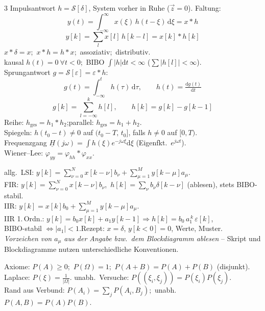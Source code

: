 \begin{multicols}{3}
Impulsantwort $h=\mathcal S[\delta]$, System vorher in Ruhe ($\vec z=0$). Faltung:
\[ y(t)=\!\int_{-\infty}^{\infty}\! x(\xi)\,h(t-\xi)\,\mathrm d\xi=x*h \]
\[ y[k]=\sum_{l} x[l]\,h[k-l]=x[k]*h[k] \]
$x*\delta=x$;\ $x*h=h*x$;\ assoziativ;\ distributiv.\\
kausal $h(t)=0\ \forall t<0$;\ BIBO $\int|h|\mathrm dt<\infty$ ($\sum|h[l]|<\infty$).\\
Sprungantwort $g=\mathcal S[\varepsilon]=\varepsilon*h$:
\[ g(t)=\!\int_{-\infty}^{t}\! h(\tau)\,\mathrm d\tau,\qquad h(t)=\tfrac{\mathrm dg(t)}{\mathrm dt} \]
\[ g[k]=\sum_{l=-\infty}^{k} h[l],\qquad h[k]=g[k]-g[k-1] \]
Reihe: $h_{\text{ges}}=h_1*h_2$;\quad parallel: $h_{\text{ges}}=h_1+h_2$.\\
Spiegeln: $h(t_0-t)\ne0$ auf $(t_0-T,\,t_0]$, falls $h\ne0$ auf $[0,T)$.\\
Frequenzgang $\underline H(j\omega)=\int h(\xi)e^{-j\omega\xi}\mathrm d\xi$ (Eigenfkt.\ $e^{j\omega t}$).\\
Wiener--Lee: $\varphi_{yy}=\varphi_{hh}*\varphi_{xx}$.

allg.\ LSI: $y[k]=\sum_{\nu=0}^{N} x[k{-}\nu]b_\nu+\sum_{\mu=1}^{M} y[k{-}\mu]a_\mu$.\\
FIR: $y[k]=\sum_{\nu=0}^{N} x[k{-}\nu]b_\nu$,\ $h[k]=\sum_{\nu} b_\nu\delta[k{-}\nu]$ (ablesen),
stets BIBO-stabil.\\
IIR: $y[k]=x[k]b_0+\sum_{\mu=1}^{M} y[k{-}\mu]a_\mu$.\\
IIR 1.\,Ordn.: $y[k]=b_0x[k]+a_1y[k{-}1]\Rightarrow h[k]=b_0\,a_1^{\,k}\,\varepsilon[k]$,\\
BIBO-stabil $\Leftrightarrow|a_1|<1$.\quad Rezept: $x=\delta$, $y[k{<}0]=0$, Werte, Muster.\\
\emph{Vorzeichen von $a_\mu$ aus der Angabe bzw.\ dem Blockdiagramm ablesen} --
Skript und Blockdiagramme nutzen unterschiedliche Konventionen.

Axiome: $P(A)\ge0$;\ $P(\Omega)=1$;\ $P(A{+}B)=P(A)+P(B)$ (disjunkt).\\
Laplace: $P(\xi)=\tfrac{1}{|\Omega|}$.\quad
unabh.\ Versuche: $P((\xi_i,\xi_j))=P(\xi_i)P(\xi_j)$.\\
Rand aus Verbund: $P(A_i)=\sum_j P(A_i,B_j)$;\ unabh.\ $P(A,B)=P(A)P(B)$.


\end{multicols}
